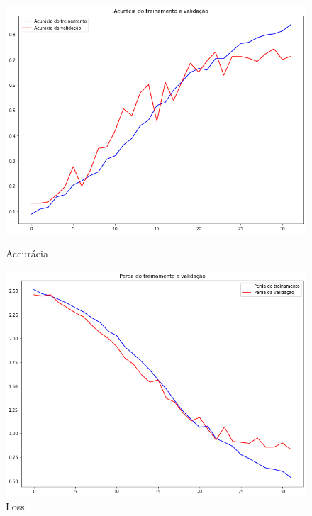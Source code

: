\documentclass[12pt]{article}
\begin{document}
\begin{figure}[!htb]
  \begin{minipage}{.47\textwidth}
    \centering
    \includegraphics[width=1.1\linewidth]{experiments/default_noaug_32/accuracy.png}
    \caption{Accurácia}\label{fig:experiment_default_noaug_32_accuracy}
  \end{minipage}\hfill
  \begin{minipage}{.47\textwidth}
    \centering
    \includegraphics[width=1.1\linewidth]{experiments/default_noaug_32/loss.png}
    \caption{Loss}\label{fig:experiment_default_noaug_32_loss}
  \end{minipage}
\end{figure}
\end{document}
